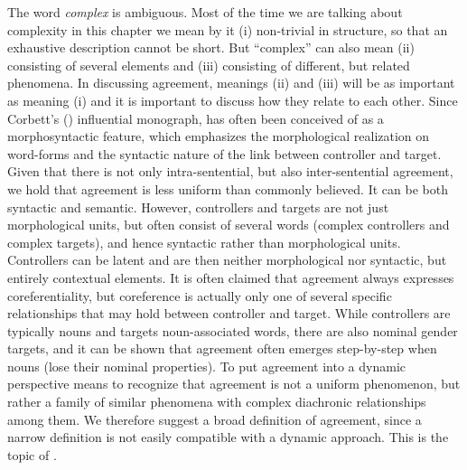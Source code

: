 \documentclass[output=collectionpaper]{langsci/langscibook}
\begin{document}
The word \textit{complex} is ambiguous. Most of the time we are talking about complexity in this chapter we mean by it (i) non-trivial in structure, so that an exhaustive description cannot be short. But ``complex'' can also mean (ii) consisting of several elements and (iii) consisting of different, but related phenomena. In discussing agreement, meanings (ii) and (iii) will be as important as meaning (i) and it is important to discuss how they relate to each other. Since Corbett's (\citealt*{Corbett2006}) influential monograph,  has often been conceived of as a morphosyntactic feature, which emphasizes the morphological realization on word-forms and the syntactic nature of the link between controller and target. Given that there is not only intra-sentential, but also inter-sentential agreement, we hold that agreement is less uniform than commonly believed. It can be both syntactic and semantic. However, controllers and targets are not just morphological units, but often consist of several words (complex controllers and complex targets), and hence syntactic rather than morphological units. Controllers can be latent and are then neither morphological nor syntactic, but entirely contextual elements. It is often claimed that agreement always expresses coreferentiality, but coreference is actually only one of several specific relationships that may hold between controller and target. While controllers are typically nouns and targets noun-associated words, there are also nominal gender targets, and it can be shown that agreement often emerges step-by-step when nouns  (lose their nominal properties). To put agreement into a dynamic perspective means to recognize that agreement is not a uniform phenomenon, but rather a family of similar phenomena with complex diachronic relationships among them. We therefore suggest a broad definition of agreement, since a narrow definition is not easily compatible with a dynamic approach. This is the topic of .
\end{document}
